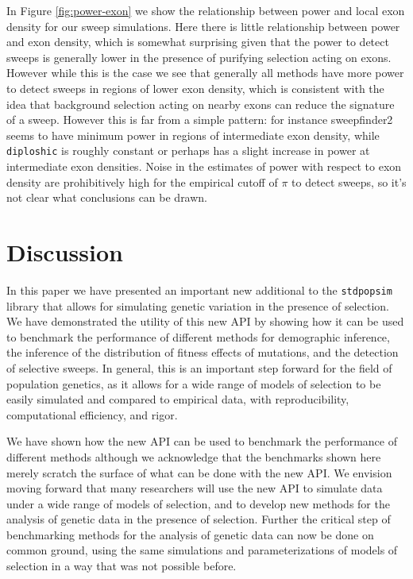 \documentclass[hidelinks]{article}
\newcommand{\stdpopsim}{\texttt{stdpopsim}\xspace}
\newcommand{\diploshic}{\texttt{diploshic}\xspace}
\begin{document}
    In Figure \ref{fig:power-exon} we show the relationship between power and local exon density for our sweep simulations.
    Here there is little relationship between power and exon density, which is somewhat surprising given that the power to detect sweeps
    is generally lower in the presence of purifying selection acting on exons. However while this is the case we see that 
    generally all methods have more power to detect sweeps in regions of lower exon density, which is consistent with the idea that
    background selection acting on nearby exons can reduce the signature of a sweep. However this is far from a simple pattern:
    for instance sweepfinder2 seems to have minimum power in regions of intermediate exon density, while \diploshic is roughly constant
    or perhaps has a slight increase in power at intermediate exon densities. Noise in the estimates of power with respect to exon density
    are prohibitively high for the empirical cutoff of $\pi$ to detect sweeps, so it's not clear what conclusions can be drawn.


\section*{Discussion}
    \label{Discussion}
    In this paper we have presented an important new additional to the \stdpopsim{} library
    that allows for simulating genetic variation in the presence of selection.
    We have demonstrated the utility of this new API by showing how it can be used to benchmark
    the performance of different methods for demographic inference, the inference of the distribution
    of fitness effects of mutations, and the detection of selective sweeps.
    In general, this is an important step forward for the field of population genetics,
    as it allows for a wide range of models of selection to be easily simulated and compared to
    empirical data, with reproducibility, computational efficiency, and rigor.

    We have shown how the new API can be used to benchmark the performance of different methods
    although we acknowledge that the benchmarks shown here merely scratch the surface of what
    can be done with the new API. We envision moving forward that many researchers will use
    the new API to simulate data under a wide range of models of selection, and to develop
    new methods for the analysis of genetic data in the presence of selection. 
    Further the critical step of benchmarking methods for the analysis of genetic data
    can now be done on common ground, using the same simulations and parameterizations of
    models of selection in a way that was not possible before.
\end{document}
